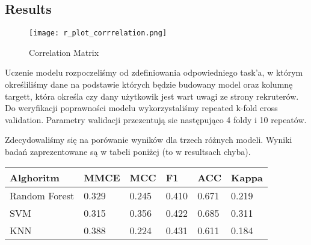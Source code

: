 \subsection{Results}
\label{sec:results}

\begin{figure}[htp]
\centering
\texttt{[image: r\_plot\_corrrelation.png]}
\caption{Correlation Matrix}
\label{fig:correlation-matrix}
\end{figure}

Uczenie modelu rozpoczeliśmy od zdefiniowania odpowiedniego task'a, w którym określiliśmy dane na podstawie których będzie budowany model oraz kolumnę targett, która określa czy dany użytkowik jest wart uwagi ze strony rekruterów. Do weryfikacji poprawności modelu wykorzystaliśmy repeated k-fold cross validation. Parametry walidacji przezentują sie następująco 4 foldy i 10 repeatów. 

Zdecydowaliśmy się na porówanie wyników dla trzech różnych modeli. Wyniki badań zaprezentowane są w tabeli poniżej (to w resultsach chyba).
\begin{center}
\begin{tabular}{ | m{5em} | m{5em}| m{5em} | m{5em}| m{5em} | m{5em}| } 
\hline
 Alghoritm & MMCE & MCC & F1 & ACC & Kappa\\ 
 \hline
 Random Forest & 0.329 & 0.245 & 0.410 & 0.671 & 0.219 \\ 
\hline
 SVM & 0.315 & 0.356 & 0.422 & 0.685 & 0.311 \\ 
\hline
 KNN & 0.388 & 0.224 & 0.431 & 0.611 & 0.184\\ 
\hline
\end{tabular}
\end{center}